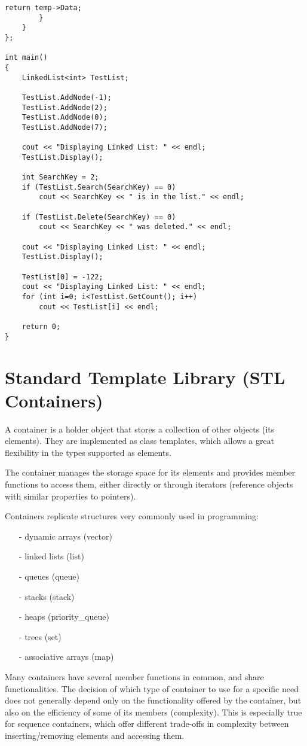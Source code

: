 \documentclass[12pt,a4paper]{article}
\begin{document}
\begin{lstlisting}[caption={Linked List Template},escapechar=$]
			return temp->Data;
		}
	}
};

int main()
{
	LinkedList<int> TestList;

	TestList.AddNode(-1);
	TestList.AddNode(2);
	TestList.AddNode(0);
	TestList.AddNode(7);

	cout << "Displaying Linked List: " << endl;
	TestList.Display();

	int SearchKey = 2;
	if (TestList.Search(SearchKey) == 0)
		cout << SearchKey << " is in the list." << endl;

	if (TestList.Delete(SearchKey) == 0)
		cout << SearchKey << " was deleted." << endl;

	cout << "Displaying Linked List: " << endl;
	TestList.Display();
	
	TestList[0] = -122;
	cout << "Displaying Linked List: " << endl;
	for (int i=0; i<TestList.GetCount(); i++)
		cout << TestList[i] << endl;

	return 0;
}
\end{lstlisting}
\section{Standard Template Library (STL Containers)}

A container is a holder object that stores a collection of other objects (its elements). 
They are implemented as class templates, which allows a great flexibility in the types supported as elements.

The container manages the storage space for its elements and provides member functions to access them,
either directly or through iterators (reference objects with similar properties to pointers).

Containers replicate structures very commonly used in programming:
\begin{itemize}
\item[-] dynamic arrays (vector)
\item[-] linked lists (list)
\item[-] queues (queue)
\item[-] stacks (stack)
\item[-] heaps (priority\_queue)
\item[-] trees (set)
\item[-] associative arrays (map)
\end{itemize}
Many containers have several member functions in common, and share functionalities.
The decision of which type of container to use for a specific need does not generally depend only on the
functionality offered by the container, but also on the efficiency of some of its members (complexity).
This is especially true for sequence containers, which offer different trade-offs in complexity between
inserting/removing elements and accessing them.
\end{document}
